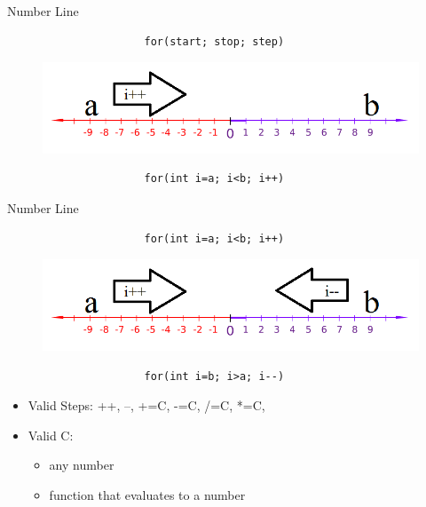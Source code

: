 \documentclass[xcolor={dvipsnames}]{beamer}
\begin{document}
\begin{frame}[fragile]{Number Line}
\begin{figure}
	\begin{verbatim}
         	    for(start; stop; step)
	\end{verbatim}
	\pause
	\includegraphics[width=1\textwidth]{nlpp}
	\begin{verbatim}
         	    for(int i=a; i<b; i++)
	\end{verbatim}
\end{figure}
\end{frame}


\begin{frame}[fragile]{Number Line}
\begin{figure}
	\begin{verbatim}
         	    for(int i=a; i<b; i++)
	\end{verbatim}
	\includegraphics[width=1\textwidth]{nlmm}
	\begin{verbatim}
         	    for(int i=b; i>a; i--)
	\end{verbatim}
\end{figure}
\pause
\begin{center}
	\begin{itemize}
	\item Valid Steps: ++, --, +=C, -=C, /=C, *=C,
	\item Valid C:
		\begin{itemize} 
		\item any number
		\item function that evaluates to a number 
		\end{itemize}
	\end{itemize}
\end{center}

\end{frame}
\end{document}
